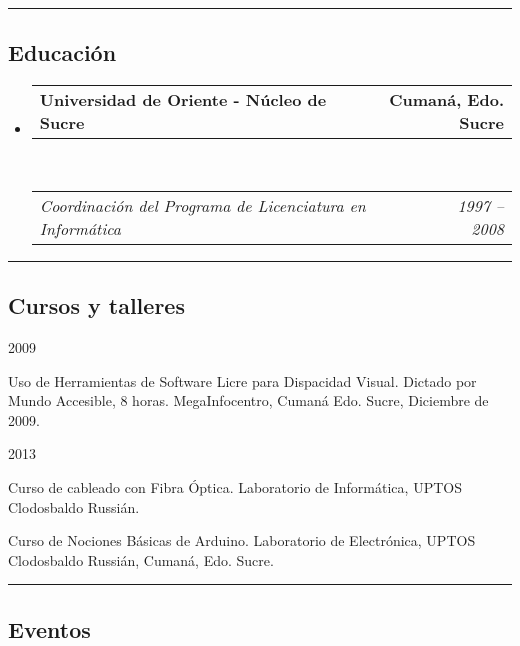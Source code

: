 \documentclass[10pt,letterpaper]{article}
\makeatletter
\newenvironment{indentsection}[1]%
{\begin{list}{}%
	{\setlength{\leftmargin}{#1}}%
	\item[]%
}
{\end{list}}
\newcommand{\headerrow}[2]
{\begin{tabular*}{\linewidth}{l@{\extracolsep{\fill}}r}
	#1 &
	#2 \\
\end{tabular*}}
\makeatother
\begin{document}
\hrule
\vspace{-0.4em}
\subsection*{Educación}

\begin{itemize}
	\parskip=0.1em

	\item 
	\headerrow
		{\textbf{Universidad de Oriente - Núcleo de Sucre}}
		{\textbf{Cumaná, Edo. Sucre}}
	\\
	\headerrow
		{\emph{Coordinación del Programa de Licenciatura en Informática}}
		{\emph{1997 -- 2008}}

\end{itemize}

\hrule
\vspace{-0.4em}
\subsection*{Cursos y talleres}

\begin{indentsection}{\parindent}
  \item {\large 2009}
    \begin{itemize*}
	    \item Uso de Herramientas de Software Licre para Dispacidad Visual. Dictado por Mundo Accesible, 8 horas. MegaInfocentro, Cumaná Edo. Sucre, Diciembre de 2009.
    \end{itemize*}
  \item {\large 2013}
    \begin{itemize*}
	    \item Curso de cableado con Fibra Óptica. Laboratorio de Informática, UPTOS Clodosbaldo Russián.
    \end{itemize*}
    \begin{itemize*}
	    \item Curso de Nociones Básicas de Arduino. Laboratorio de Electrónica, UPTOS Clodosbaldo Russián, Cumaná, Edo. Sucre.
    \end{itemize*}
\end{indentsection}

\hrule
\vspace{-0.4em}
\subsection*{Eventos}
\end{document}
